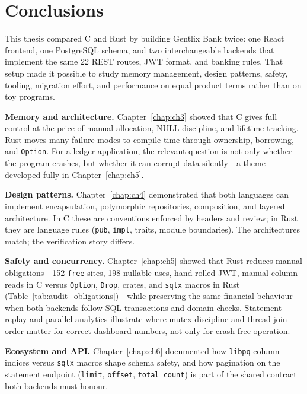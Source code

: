 \chapter{Conclusions}
\label{conclusions}

\par This thesis compared C and Rust by building Gentlix Bank twice: one React frontend, 
one PostgreSQL schema, and two interchangeable backends that implement the same 22 REST 
routes, JWT format, and banking rules. That setup made it possible to study memory management, 
design patterns, safety, tooling, migration effort, and performance on equal product terms 
rather than on toy programs.

\par \textbf{Memory and architecture.} Chapter~\ref{chap:ch3} showed that C gives full 
control at the price of manual allocation, NULL discipline, and lifetime tracking. Rust 
moves many failure modes to compile time through ownership, borrowing, and \texttt{Option}. 
For a ledger application, the relevant question is not only whether the program crashes, 
but whether it can corrupt data silently---a theme developed fully in Chapter~\ref{chap:ch5}.

\par \textbf{Design patterns.} Chapter~\ref{chap:ch4} demonstrated that both languages 
can implement encapsulation, polymorphic repositories, composition, and layered architecture. 
In C these are conventions enforced by headers and review; in Rust they are language rules 
(\texttt{pub}, \texttt{impl}, traits, module boundaries). The architectures match; the 
verification story differs.

\par \textbf{Safety and concurrency.} Chapter~\ref{chap:ch5} showed that Rust reduces manual 
obligations---152 \texttt{free} sites, 198 nullable uses, hand-rolled JWT, manual column 
reads in C versus \texttt{Option}, \texttt{Drop}, crates, and \texttt{sqlx} macros in Rust 
(Table~\ref{tab:audit_obligations})---while preserving the same financial behaviour when 
both backends follow SQL transactions and domain checks. Statement replay and parallel 
analytics illustrate where mutex discipline and thread join order matter for correct dashboard 
numbers, not only for crash-free operation.

\par \textbf{Ecosystem and API.} Chapter~\ref{chap:ch6} documented how \texttt{libpq} column 
indices versus \texttt{sqlx} macros shape schema safety, and how pagination on the statement 
endpoint (\texttt{limit}, \texttt{offset}, \texttt{total\_count}) is part of the shared 
contract both backends must honour.

